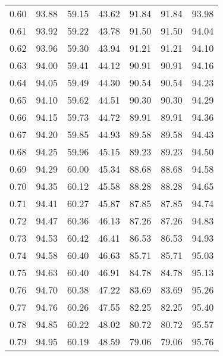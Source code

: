 \begin{tabular}{|c|c|c|c|c|c|c|}
      0.60 &     93.88 &     59.15 &      43.62 &   91.84 &      91.84 &         93.98 \\
      0.61 &     93.92 &     59.22 &      43.78 &   91.50 &      91.50 &         94.04 \\
      0.62 &     93.96 &     59.30 &      43.94 &   91.21 &      91.21 &         94.10 \\
      0.63 &     94.00 &     59.41 &      44.12 &   90.91 &      90.91 &         94.16 \\
      0.64 &     94.05 &     59.49 &      44.30 &   90.54 &      90.54 &         94.23 \\
      0.65 &     94.10 &     59.62 &      44.51 &   90.30 &      90.30 &         94.29 \\
      0.66 &     94.15 &     59.73 &      44.72 &   89.91 &      89.91 &         94.36 \\
      0.67 &     94.20 &     59.85 &      44.93 &   89.58 &      89.58 &         94.43 \\
      0.68 &     94.25 &     59.96 &      45.15 &   89.23 &      89.23 &         94.50 \\
      0.69 &     94.29 &     60.00 &      45.34 &   88.68 &      88.68 &         94.58 \\
      0.70 &     94.35 &     60.12 &      45.58 &   88.28 &      88.28 &         94.65 \\
      0.71 &     94.41 &     60.27 &      45.87 &   87.85 &      87.85 &         94.74 \\
      0.72 &     94.47 &     60.36 &      46.13 &   87.26 &      87.26 &         94.83 \\
      0.73 &     94.53 &     60.42 &      46.41 &   86.53 &      86.53 &         94.93 \\
      0.74 &     94.58 &     60.40 &      46.63 &   85.71 &      85.71 &         95.03 \\
      0.75 &     94.63 &     60.40 &      46.91 &   84.78 &      84.78 &         95.13 \\
      0.76 &     94.70 &     60.38 &      47.22 &   83.69 &      83.69 &         95.26 \\
      0.77 &     94.76 &     60.26 &      47.55 &   82.25 &      82.25 &         95.40 \\
      0.78 &     94.85 &     60.22 &      48.02 &   80.72 &      80.72 &         95.57 \\
      0.79 &     94.95 &     60.19 &      48.59 &   79.06 &      79.06 &         95.76 \\

\end{tabular}
